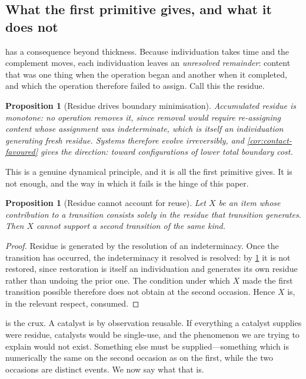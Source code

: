 \documentclass[11pt,twocolumn,a4paper]{article}
\theoremstyle{plain}
\newtheorem{proposition}[theorem]{Proposition}
\theoremstyle{definition}
\theoremstyle{remark}
\begin{document}
\subsection{What the first primitive gives, and what it does not}
\label{sec:residue-limits}

 has a consequence beyond thickness. Because individuation
takes time and the complement moves, each individuation leaves an
\emph{unresolved remainder}: content that was one thing when the operation began
and another when it completed, and which the operation therefore failed to
assign. Call this the residue.

\begin{proposition}[Residue drives boundary minimisation]
\label{prop:residue-drives}
Accumulated residue is monotone: no operation removes it, since removal would
require re-assigning content whose assignment was indeterminate, which is itself
an individuation generating fresh residue. Systems therefore evolve
irreversibly, and \cref{cor:contact-favoured} gives the direction: toward
configurations of lower total boundary cost.
\end{proposition}

This is a genuine dynamical principle, and it is all the first primitive gives.
It is not enough, and the way in which it fails is the hinge of this paper.

\begin{proposition}[Residue cannot account for reuse]
\label{prop:no-reuse}
Let $X$ be an item whose contribution to a transition consists solely in the
residue that transition generates. Then $X$ cannot support a second transition
of the same kind.
\end{proposition}

\begin{proof}
Residue is generated by the resolution of an indeterminacy. Once the transition
has occurred, the indeterminacy it resolved is resolved: by
\cref{prop:residue-drives} it is not restored, since restoration is itself an
individuation and generates its own residue rather than undoing the prior one.
The condition under which $X$ made the first transition possible therefore does
not obtain at the second occasion. Hence $X$ is, in the relevant respect,
consumed.
\end{proof}

 is the crux. A catalyst is by observation reusable. If
everything a catalyst supplies were residue, catalysts would be single-use, and
the phenomenon we are trying to explain would not exist. Something else must be
supplied---something which is numerically the same on the second occasion as on
the first, while the two occasions are distinct events. We now say what that is.
\end{document}
